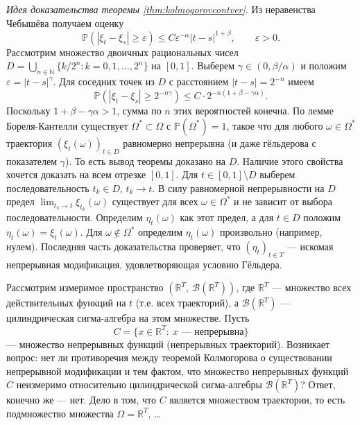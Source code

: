 \documentclass[10pt]{article}
\theoremstyle{boldnormal}
\newcommand{\R}{{\ensuremath{\mathbb{R}}}}
\theoremstyle{boldremark}
\newenvironment{remark}
  {\pushQED{\qed}\renewcommand{\qedsymbol}{$\diamond$}\rem}
  {\popQED\endrem}
\begin{document}
\textit{Идея доказательства теоремы \ref{thm:kolmogorovcontver}}. 
Из неравенства Чебышёва получаем оценку
\[
\mathbb{P}(|\xi_t-\xi_s|\ge \varepsilon)\le C\varepsilon^{-\alpha}|t-s|^{1+\beta},\qquad \varepsilon>0.
\]
Рассмотрим множество двоичных рациональных чисел 
$D=\bigcup_{n\in\mathbb{N}}\{k/2^n: k=0,1,\ldots,2^n\}$ на $[0,1]$.
Выберем $\gamma\in(0,\beta/\alpha)$ и положим $\varepsilon=|t-s|^\gamma$.
Для соседних точек из $D$ с расстоянием $|t-s|=2^{-n}$ имеем
\[
\mathbb{P}(|\xi_t-\xi_s|\ge 2^{-n\gamma})\le C\cdot 2^{-n(1+\beta-\gamma\alpha)}.
\]
Поскольку $1+\beta-\gamma\alpha>1$, сумма по $n$ этих вероятностей конечна.
По лемме Бореля-Кантелли существует $\Omega^*\subset\Omega$ с $\mathbb{P}(\Omega^*)=1$,
такое что для любого $\omega\in\Omega^*$ траектория $(\xi_t(\omega))_{t\in D}$
равномерно непрерывна (и даже гёльдерова с показателем $\gamma$). То есть вывод теоремы доказано на $D$. Наличие этого свойства хочется доказать на всем отрезке $[0,1]$. Для $t\in[0,1]\setminus D$ выберем последовательность $t_k\in D$, $t_k\to t$.
В силу равномерной непрерывности на $D$ предел $\lim_{t_k\to t}\xi_{t_k}(\omega)$
существует для всех $\omega\in\Omega^*$ и не зависит от выбора последовательности.
Определим $\eta_t(\omega)$ как этот предел, а для $t\in D$ положим $\eta_t(\omega)=\xi_t(\omega)$.
Для $\omega\notin\Omega^*$ определим $\eta_t(\omega)$ произвольно (например, нулем).
Последняя часть доказательства проверяет, что $(\eta_t)_{t\in T}$ --- искомая непрерывная модификация, удовлетворяющая условию Гёльдера.


\begin{remark}
Рассмотрим измеримое пространство $(\mathbb{R}^T,\ \mathcal{B}(\mathbb{R}^T))$, где $\mathbb{R}^T$ — множество всех действительных функций на $t$ (т.е. всех траекторий), а $\mathcal{B}(\mathbb{R}^T)$ — цилиндрическая сигма-алгебра на этом множестве.
Пусть 
\[
C=\{x \in \mathbb{R}^T:\ x \text{ --- непрерывна}\}
\]
— множество непрерывных функций (непрерывных траекторий).
Возникает вопрос: нет ли противоречия между теоремой Колмогорова о существовании непрерывной модификации и тем фактом, что множество непрерывных функций $C$ неизмеримо относительно цилиндрической сигма-алгебры $\mathcal{B}(\mathbb{R}^T)$? Ответ, конечно же --- нет. Дело в том, что \(C\) является множеством траектории, то есть подмножество множества 
\(\Omega = \R^T\), \ldots
\end{remark}
\end{document}
